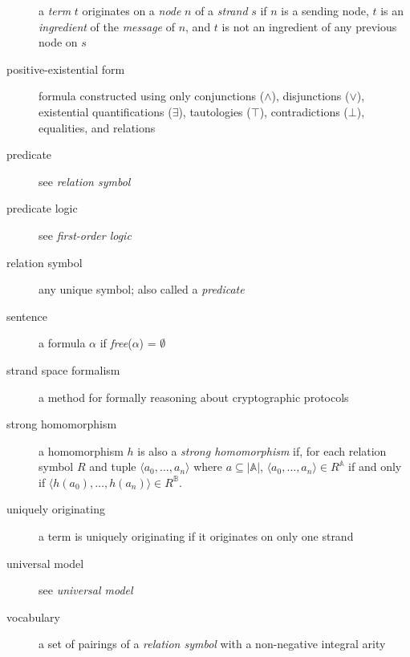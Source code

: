 \begin{description}
			a \emph{term} $t$ originates on a \emph{node} $n$ of a
			\emph{strand} $s$ if $n$ is a sending node, $t$ is an
			\emph{ingredient} of the \emph{message} of $n$, and $t$ is not an
			ingredient of any previous node on $s$
		\item[positive-existential form]
			formula constructed using only conjunctions ($\wedge$),
			disjunctions ($\vee$), existential quantifications ($\exists$),
			tautologies ($\top$), contradictions ($\bot$), equalities, and
			relations
		\item[predicate]
			see \emph{relation symbol}
		\item[predicate logic]
			see \emph{first-order logic}
		\item[relation symbol]
			any unique symbol; also called a \emph{predicate}
		\item[sentence]
			a formula $\alpha$ if \emph{free}($\alpha$) = $\emptyset$
		\item[strand space formalism]
			a method for formally reasoning about cryptographic protocols
		\item[strong homomorphism]
			a homomorphism $h$ is also a \emph{strong homomorphism} if, for each
			relation symbol $R$ and tuple $\langle a_0 , \ldots , a_n \rangle$
			where $a \subseteq |\mathbb{A}|$, $\langle a_0 , \ldots , a_n  \rangle
			\in R^\mathbb{A}$ if and only if $\langle h(a_0) , \ldots , h(a_n)
			\rangle \in R^\mathbb{B}$.
		\item[uniquely originating]
			a term is uniquely originating if it originates on only one strand
		\item[universal model]
			see \emph{universal model}
		\item[vocabulary]
			a set of pairings of a \emph{relation symbol} with a non-negative
			integral arity
	\end{description}
